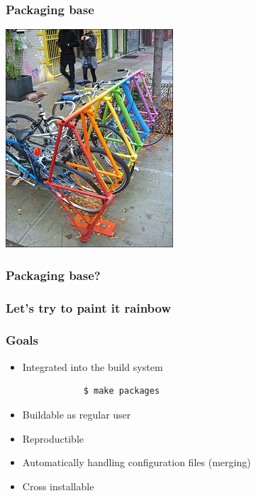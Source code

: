 \begin{frame}
	\frametitle{Packaging base}
	\center
	\includegraphics[scale=0.6]{rainbow-bikeshed.jpg}
\end{frame}

\begin{frame}
	\frametitle{Packaging base?}
	\pause
	\colorbox{red}{\makebox[\textwidth]{\textcolor{white}{Do not split}}}
	\pause
	\colorbox{orange}{}
	\pause
	\colorbox{yellow}{}
	\pause
	\colorbox{green}{}
	\pause
	\colorbox{blue}{\makebox[\textwidth]{\textcolor{white}{No development file}}}
	\pause
	\colorbox{indigo!75}{\makebox[\textwidth]{\textcolor{white}{No documentation}}}
	\pause
	\colorbox{violet}{\makebox[\textwidth]{\textcolor{white}{I want debug files}}}
\end{frame}

\begin{frame}
	\frametitle{Let's try to paint it rainbow}
	\colorbox{red}{\makebox[\textwidth]{\textcolor{white}{FreeBSD FreeBSD-base FreeBSD-kernel FreeBSD-docs}}}
	\pause
	\colorbox{orange}{}
	\pause
	\colorbox{yellow}{}
	\pause
	\colorbox{green}{}
	\pause
	\colorbox{blue}{\makebox[\textwidth]{\textcolor{white}{runtime separated from development files}}}
	\pause
	\colorbox{indigo!75}{\makebox[\textwidth]{\textcolor{white}{FreeBSD-docs (does not concern manpages)}}}
	\pause
	\colorbox{violet}{\makebox[\textwidth]{\textcolor{white}{-debug packages}}}
\end{frame}

\begin{frame}[fragile]
	\frametitle{Goals}
	\begin{itemize}
		\item Integrated into the build system
			\begin{lstlisting}
			$ make packages
			\end{lstlisting}
		\item Buildable as regular user
		\item Reproductible
		\item Automatically handling configuration files (merging)
		\item Cross installable
	\end{itemize}
\end{frame}

